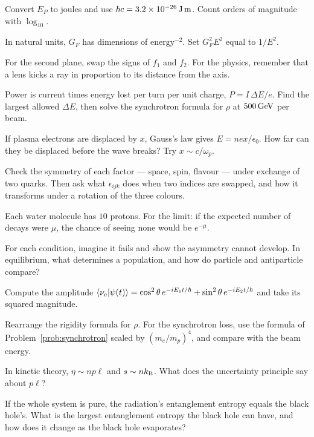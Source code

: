 
 Convert $E_P$ to joules and use $\hbar c = 3.2\times10^{-26}\,\mathrm{J\,m}$. Count orders of magnitude with $\log_{10}$.

 In natural units, $G_F$ has dimensions of $\text{energy}^{-2}$. Set $G_F^2E^2$ equal to $1/E^2$.


 For the second plane, swap the signs of $f_1$ and $f_2$. For the physics, remember that a lens kicks a ray in proportion to its distance from the axis.

 Power is current times energy lost per turn per unit charge, $P = I\,\Delta E/e$. Find the largest allowed $\Delta E$, then solve the synchrotron formula for $\rho$ at $500\,\mathrm{GeV}$ per beam.

 If plasma electrons are displaced by $x$, Gauss's law gives $E = nex/\epsilon_0$. How far can they be displaced before the wave breaks? Try $x\sim c/\omega_p$.


 Check the symmetry of each factor --- space, spin, flavour --- under exchange of two quarks. Then ask what $\epsilon_{ijk}$ does when two indices are swapped, and how it transforms under a rotation of the three colours.

 Each water molecule has $10$ protons. For the limit: if the expected number of decays were $\mu$, the chance of seeing none would be $e^{-\mu}$.

 For each condition, imagine it fails and show the asymmetry cannot develop. In equilibrium, what determines a population, and how do particle and antiparticle compare?

 Compute the amplitude $\langle \nu_e\vert \psi(t)\rangle = \cos^2\theta\,e^{-iE_1t/\hbar} + \sin^2\theta\,e^{-iE_2t/\hbar}$ and take its squared magnitude.


 Rearrange the rigidity formula for $\rho$. For the synchrotron loss, use the formula of Problem~\ref{prob:synchrotron} scaled by $(m_e/m_p)^4$, and compare with the beam energy.

 In kinetic theory, $\eta\sim np\ell$ and $s\sim nk_{\mathrm{B}}$. What does the uncertainty principle say about $p\ell$?

 If the whole system is pure, the radiation's entanglement entropy equals the black hole's. What is the largest entanglement entropy the black hole can have, and how does it change as the black hole evaporates?

